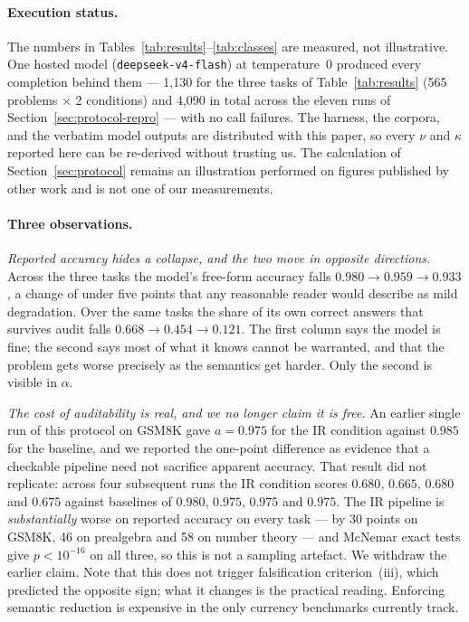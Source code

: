 \documentclass[11pt,a4paper]{article}
\begin{document}
\paragraph{Execution status.}
The numbers in Tables~\ref{tab:results}--\ref{tab:classes} are measured, not
illustrative.  One hosted model (\texttt{deepseek-v4-flash}) at temperature~0
produced every completion behind them --- 1,130 for the three tasks of
Table~\ref{tab:results} (565 problems $\times$ 2 conditions) and 4,090 in total
across the eleven runs of Section~\ref{sec:protocol-repro} --- with no call
failures.  The harness, the corpora, and the verbatim model outputs are
distributed with this paper, so every $\nu$ and $\kappa$ reported here can be
re-derived without trusting us.  The calculation of
Section~\ref{sec:protocol} remains an illustration performed on figures
published by other work and is not one of our measurements.

\paragraph{Three observations.}
\textit{Reported accuracy hides a collapse, and the two move in opposite
directions.}  Across the three tasks the model's free-form accuracy falls
$0.980 \to 0.959 \to 0.933$, a change of under five points that any reasonable
reader would describe as mild degradation.  Over the same tasks the share of its
own correct answers that survives audit falls $0.668 \to 0.454 \to 0.121$.  The
first column says the model is fine; the second says most of what it knows
cannot be warranted, and that the problem gets worse precisely as the semantics
get harder.  Only the second is visible in $\alpha$.

\textit{The cost of auditability is real, and we no longer claim it is free.}
An earlier single run of this protocol on GSM8K gave $a = 0.975$ for the IR
condition against $0.985$ for the baseline, and we reported the one-point
difference as evidence that a checkable pipeline need not sacrifice apparent
accuracy.  That result did not replicate: across four subsequent runs the IR
condition scores $0.680$, $0.665$, $0.680$ and $0.675$ against baselines of
$0.980$, $0.975$, $0.975$ and $0.975$.  The IR pipeline is
\emph{substantially} worse on reported accuracy on every task --- by 30 points
on GSM8K, 46 on prealgebra and 58 on number theory --- and McNemar exact tests
give $p < 10^{-16}$ on all three, so this is not a sampling artefact.  We
withdraw the earlier claim.  Note that this does not trigger falsification
criterion~(iii), which predicted the opposite sign; what it changes is the
practical reading.  Enforcing semantic reduction is expensive in the only
currency benchmarks currently track.
\end{document}
